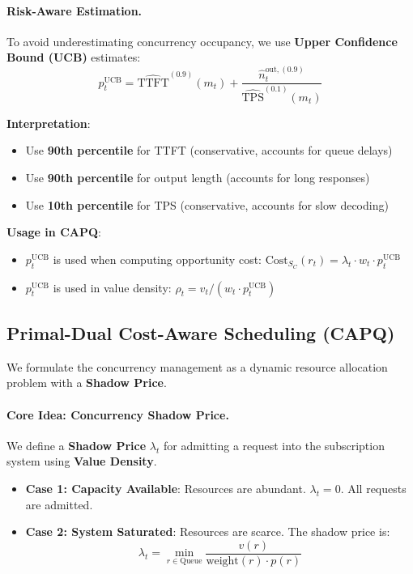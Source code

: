 \documentclass[11pt]{article}
\begin{document}
\paragraph{Risk-Aware Estimation.}
To avoid underestimating concurrency occupancy, we use \textbf{Upper Confidence Bound (UCB)} estimates:
\[ p_t^{\text{UCB}} = \widehat{\text{TTFT}}^{(0.9)}(m_t) + \frac{\hat{n}^{\text{out},(0.9)}_t}{\widehat{\text{TPS}}^{(0.1)}(m_t)} \]

\textbf{Interpretation}:
\begin{itemize}
  \item Use \textbf{90th percentile} for TTFT (conservative, accounts for queue delays)
  \item Use \textbf{90th percentile} for output length (accounts for long responses)
  \item Use \textbf{10th percentile} for TPS (conservative, accounts for slow decoding)
\end{itemize}

\textbf{Usage in CAPQ}:
\begin{itemize}
  \item $p_t^{\text{UCB}}$ is used when computing opportunity cost: $\text{Cost}_{S_C}(r_t) = \lambda_t \cdot w_t \cdot p_t^{\text{UCB}}$
  \item $p_t^{\text{UCB}}$ is used in value density: $\rho_t = v_t / (w_t \cdot p_t^{\text{UCB}})$
\end{itemize}

\subsection{Primal-Dual Cost-Aware Scheduling (CAPQ)}

We formulate the concurrency management as a dynamic resource allocation problem with a \textbf{Shadow Price}.

\paragraph{Core Idea: Concurrency Shadow Price.}
We define a \textbf{Shadow Price} $\lambda_t$ for admitting a request into the subscription system using \textbf{Value Density}.

\begin{itemize}
  \item \textbf{Case 1: Capacity Available}: Resources are abundant. $\lambda_t = 0$. All requests are admitted.
  \item \textbf{Case 2: System Saturated}: Resources are scarce. The shadow price is:
  \[ \lambda_t = \min_{r \in \text{Queue}} \frac{v(r)}{\text{weight}(r) \cdot p(r)} \]
\end{itemize}
\end{document}
